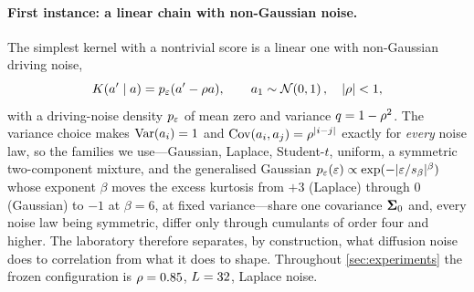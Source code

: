 \paragraph{First instance: a linear chain with non-Gaussian noise.}
The simplest kernel with a nontrivial score is a linear one with non-Gaussian driving noise,
\begin{equation}
  K(a'\mid a)=p_{\varepsilon}(a'-\rho a),\qquad a_1\sim\mathcal{N}\!\left(0,1\right),\quad |\rho|<1,
  \label{eq:linear}
\end{equation}
with a driving-noise density $p_{\varepsilon}$ of mean zero and variance $q=1-\rho^2$. The
variance choice makes $\operatorname{Var}(a_i)=1$ and $\operatorname{Cov}(a_i,a_j)=\rho^{|i-j|}$ exactly for \emph{every}
noise law, so the families we use---Gaussian, Laplace, Student-$t$, uniform, a symmetric
two-component mixture, and the generalised Gaussian
$p_{\varepsilon}(\varepsilon)\propto\exp(-|\varepsilon/s_\beta|^\beta)$ whose exponent $\beta$ moves the
excess kurtosis from $+3$ (Laplace) through $0$ (Gaussian) to $-1$ at $\beta=6$, at fixed
variance---share one covariance $\mathbf{\Sigma}_0$ and, every noise law being symmetric, differ only through
cumulants of order four and higher. The laboratory therefore separates, by construction, what
diffusion noise does to correlation from what it does to shape. Throughout \cref{sec:experiments}
the frozen configuration is $\rho=0.85$, $L=32$, Laplace noise.

